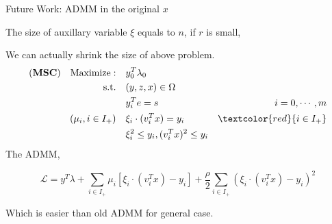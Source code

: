 \documentclass[aspectratio=1610, 10pt]{beamer}
\newcommand{\model}[1]{(\textbf{#1})}
\newcommand{\red}[1]{\textcolor{red}{#1}}
\begin{document}
\begin{frame}[allowframebreaks]{Future Work: ADMM in the original \(x\)}
  \framebreak

  The size of auxillary variable \(\xi\) equals to \(n\), if \(r\) is small,

  We can actually shrink the size of above problem.
  \begin{align}
    \model{MSC} \quad \mathrm{Maximize: }\quad & y_0 ^T\lambda_0                                       \\
    \mathrm{s.t.} \quad                        & (y,z,x) \in \Omega                                    \\
                                               & y_i^Te = s                           & i=0, \cdots, m \\
    ( \mu_i, i\in I_+ )    \quad               & \xi_i \cdot (v_i^Tx) = y_i           & \red{i\in I_+} \\
                                               & \xi_i^2 \le y_i,  (v_i^Tx)^2 \le y_i
  \end{align}
  The ADMM,

  \begin{equation}
    \mathcal L = y^T\lambda + \sum_{i \in I_+} \mu_i \left [\xi_i \cdot(v_i^Tx) - y_i\right] + \frac{\rho}{2}\sum_{i \in I_+} (\xi_i \cdot (v_i^Tx) - y_i)^2
  \end{equation}

  Which is easier than old ADMM for general case.

\end{frame}
\end{document}
